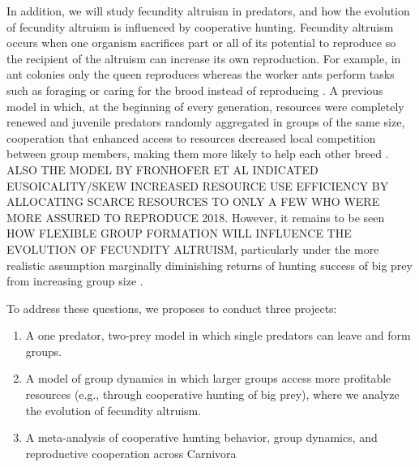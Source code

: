 In addition, we will study fecundity altruism in predators, and how the evolution of fecundity altruism is influenced by cooperative hunting. Fecundity altruism occurs when one organism sacrifices part or all of its potential to reproduce so the recipient of the altruism can increase its own reproduction. For example, in ant colonies only the queen reproduces whereas the worker ants perform tasks such as foraging or caring for the brood instead of reproducing \cite{holldobler1990ants}. A previous model in which, at the beginning of every generation, resources were completely renewed and juvenile predators randomly aggregated in groups of the same size, cooperation that enhanced access to resources decreased local competition between group members, making them more likely to help each other breed \cite{van_dyken_origins_2012_II}. ALSO THE MODEL BY FRONHOFER ET AL INDICATED EUSOICALITY/SKEW INCREASED RESOURCE USE EFFICIENCY BY ALLOCATING SCARCE RESOURCES TO ONLY A FEW WHO WERE MORE ASSURED TO REPRODUCE 2018. However, it remains to be seen HOW FLEXIBLE GROUP FORMATION WILL INFLUENCE THE EVOLUTION OF FECUNDITY ALTRUISM, particularly under the more realistic assumption marginally diminishing returns of hunting success of big prey from increasing group size \citep[for examples, see][]{macnulty_influence_2014, holekamp_hunting_1997, fanshawe_factors_1993, caraco_ecological_1975}. 

To address these questions, we proposes to conduct three projects:
\begin{enumerate}
\item A one predator, two-prey model in which single predators can leave and form groups. 
\item A model of group dynamics in which larger groups access more profitable resources (e.g., through cooperative hunting of big prey), where we analyze the evolution of fecundity altruism.
\item A meta-analysis of cooperative hunting behavior, group dynamics, and reproductive cooperation across Carnivora
\end{enumerate}

